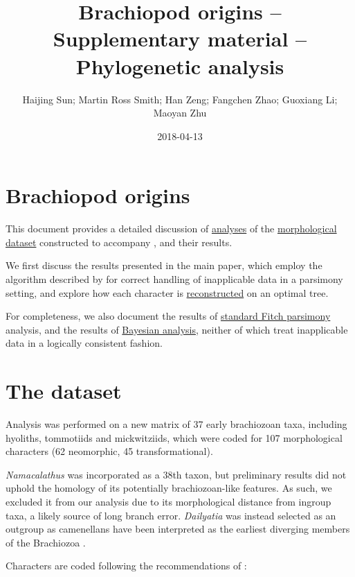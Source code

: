 \documentclass[]{book}
\title{Brachiopod origins -- Supplementary material -- Phylogenetic analysis}
\author{Haijing Sun; Martin Ross Smith; Han Zeng; Fangchen Zhao; Guoxiang Li;
Maoyan Zhu}
\date{2018-04-13}
\theoremstyle{definition}
\theoremstyle{definition}
\theoremstyle{definition}
\theoremstyle{remark}
\begin{document}
\maketitle

{
\setcounter{tocdepth}{1}
\tableofcontents
}
\hypertarget{brachiopod-origins}{%
\chapter*{Brachiopod origins}\label{brachiopod-origins}}

This document provides a detailed discussion of
\protect\hyperlink{treesearch}{analyses} of the
\protect\hyperlink{dataset}{morphological dataset} constructed to
accompany \citet{Sun2018Hyolithswith}, and their results.

We first discuss the results presented in the main paper, which employ
the algorithm described by \citet{Brazeau2018} for correct handling of
inapplicable data in a parsimony setting, and explore how each character
is \protect\hyperlink{reconstructions}{reconstructed} on an optimal
tree.

For completeness, we also document the results of
\protect\hyperlink{fitch}{standard Fitch parsimony} analysis, and the
results of \protect\hyperlink{bayesian}{Bayesian analysis}, neither of
which treat inapplicable data in a logically consistent fashion.

\hypertarget{dataset}{%
\chapter{The dataset}\label{dataset}}

Analysis was performed on a new matrix of 37 early brachiozoan taxa,
including hyoliths, tommotiids and mickwitziids, which were coded for
107 morphological characters (62 neomorphic, 45 transformational).

\emph{Namacalathus} was incorporated as a 38th taxon, but preliminary
results did not uphold the homology of its potentially brachiozoan-like
features. As such, we excluded it from our analysis due to its
morphological distance from ingroup taxa, a likely source of long branch
error. \emph{Dailyatia} was instead selected as an outgroup as
camenellans have been interpreted as the earliest diverging members of
the Brachiozoa \citep{Skovsted2015Theearly, Zhao2017}.

Characters are coded following the recommendations of
\citet{Brazeau2018}:
\end{document}
